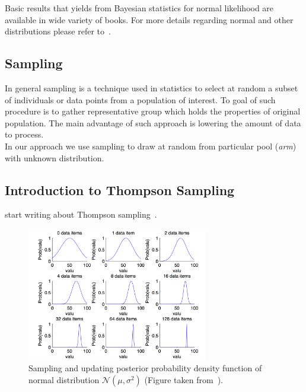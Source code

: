 \documentclass[12pt, a4paper, pdflatex]{report}
\begin{document}
Basic results that yields from Bayesian statistics for normal likelihood are available in wide variety of books. For more details regarding normal and other distributions please refer to~\cite{lynch2007introduction}\cite{gelman2003bayesian}.\\

\subsection{Sampling}
In general sampling is a technique used in statistics to select at random a subset of individuals or data points from a population of interest. To goal of such procedure is to gather representative group which holds the properties of original population. The main advantage of such approach is lowering the amount of data to process.\\
In our approach we use sampling to draw at random from particular pool (\emph{arm}) with unknown distribution.



\subsection{Introduction to Thompson Sampling\label{sec:thompson}}
start writing about Thompson sampling~\cite{May:2012:OBS:2503308.2343711}.




\begin{figure}[htbp]
\centering
\includegraphics[width=0.7\textwidth]{graphics/sampling.png}
\begin{tiny}
\caption{Sampling and updating posterior probability density function of normal distribution $\mathcal{N}\left( \mu , \sigma^2 \right)$ (Figure taken from~\cite{Jacobs2008normalnormal}).\label{fig:sampling}}
\end{tiny}
\vspace{1cm}
\end{figure}
\end{document}
